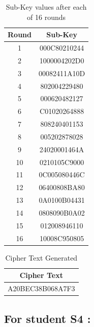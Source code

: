 \documentclass[12pt, letterpaper]{article}
\begin{document}
\begin{table}[h]
    \centering
    \begin{tabular}{|c|c|}
        \hline
        \textbf{Round} & \textbf{Sub-Key} \\
        \hline
        1 & 000C80210244
 \\
        \hline
        2 & 1000004202D0
 \\
        \hline
        3 & 00082411A10D                                                                  
 \\
        \hline
        4 & 802004229480
 \\
        \hline
        5 & 000620482127
 \\
        \hline 
        6 & C01020264888
 \\
        \hline
        7 & 808240401153
 \\
        \hline
        8 & 005202878028
 \\
        \hline
        9 & 24020001464A
 \\
        \hline
        10 & 0210105C9000
 \\
        \hline
        11 & 0C005080446C
 \\
        \hline
        12 & 06400808BA80 \\
        \hline
        13 & 0A0100B04431 \\
        \hline
        14 & 0808090B0A02
 \\
        \hline
        15 & 012008946110 \\
        \hline
        16 & 10008C950805 \\
        \hline

    \end{tabular}
    \caption{Sub-Key values after each of 16 rounds}
    \label{tab:student-info}
\end{table}



\begin{table}[h]
    \centering
    \begin{tabular}{|c|}
        \hline
          Cipher Text \\
        \hline
           A20BEC38B068A7F3
  \\
        \hline
    \end{tabular}
    \caption{Cipher Text Generated}
    \label{tab:text-key}
\end{table}

\clearpage


\subsection{{For student S4 :}}
\end{document}
